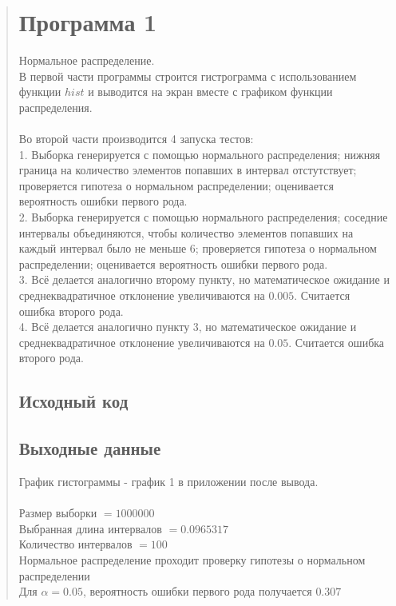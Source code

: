 \documentclass{article}
\begin{document}
\begin{quote}
\section{Программа 1}	
        Нормальное распределение. \\
	В первой части программы строится гистрограмма с использованием функции $hist$ и выводится на экран вместе с графиком функции распределения. \\ \\
	Во второй части производится 4 запуска тестов: \\
	1. Выборка генерируется с помощью нормального распределения; нижняя граница на количество элементов попавших в интервал отстутствует; проверяется гипотеза о нормальном распределении; оценивается вероятность ошибки первого рода. \\
	2. Выборка генерируется с помощью нормального распределения; соседние интервалы объединяются, чтобы количество элементов попавших на каждый интервал было не меньше 6; проверяется гипотеза о нормальном распределении; оценивается вероятность ошибки первого рода. \\
	3. Всё делается аналогично второму пункту, но математическое ожидание и среднеквадратичное отклонение увеличиваются на $0.005$. Считается ошибка второго рода. \\
	4. Всё делается аналогично пункту 3, но математическое ожидание и среднеквадратичное отклонение увеличиваются на $0.05$. Считается ошибка второго рода.
\subsection{Исходный код}
	
\subsection{Выходные данные}
	График гистограммы - график 1 в приложении после вывода. \\ \\

	Размер выборки $= 1000000$ \\
	Выбранная длина интервалов $= 0.0965317$ \\
	Количество интервалов $= 100$ \\

	Нормальное распределение проходит проверку гипотезы о нормальном распределении \\
	Для $\alpha = 0.05$, вероятность ошибки первого рода получается $0.307$ \\


\end{quote}
\end{document}
